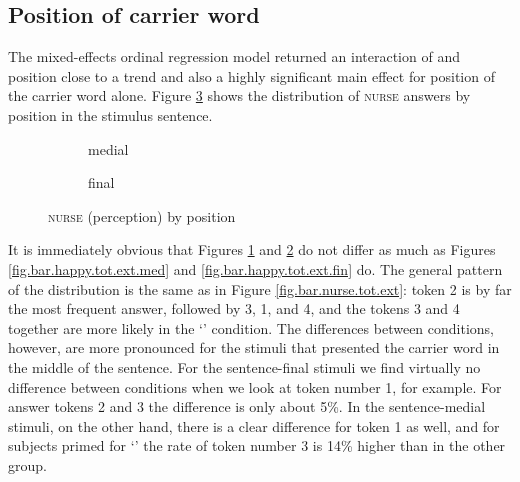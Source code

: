 \subsection{Position of carrier word}
\label{sec.perc_res.nurse.position}

The mixed-effects ordinal regression model returned an interaction of  and position close to a trend and also a highly significant main effect for position of the carrier word alone.
Figure \ref{fig.bar.nurse.tot.ext.pos} shows the distribution of \textsc{nurse} answers by position in the stimulus sentence.

\begin{figure}[h]
	\centering
	\begin{subfigure}{0.49\textwidth}
		\centering
			\resizebox{\linewidth}{!}{} 
		\caption{medial}
		\label{fig.bar.nurse.tot.ext.med}
	\end{subfigure}
	\begin{subfigure}{0.49\textwidth}
		\centering
			\resizebox{\linewidth}{!}{} 
		\caption{final}
		\label{fig.bar.nurse.tot.ext.fin}
	\end{subfigure}
	\caption{\textsc{nurse} (perception) by position}
	\label{fig.bar.nurse.tot.ext.pos}
\end{figure}

It is immediately obvious that Figures \ref{fig.bar.nurse.tot.ext.med} and \ref{fig.bar.nurse.tot.ext.fin} do not differ as much as Figures \ref{fig.bar.happy.tot.ext.med} and \ref{fig.bar.happy.tot.ext.fin} do.
The general pattern of the distribution is the same as in Figure \ref{fig.bar.nurse.tot.ext}: token 2 is by far the most frequent answer, followed by 3, 1, and 4, and the  tokens 3 and 4 together are more likely in the `' condition.
The differences between  conditions, however, are more pronounced for the stimuli that presented the carrier word in the middle of the sentence.
For the sentence-final stimuli we find virtually no difference between  conditions when we look at token number 1, for example.
For answer tokens 2 and 3 the difference is only about 5\%.
In the sentence-medial stimuli, on the other hand, there is a clear difference for token 1 as well, and for subjects primed for `' the rate of token number 3 is 14\% higher than in the other group.

